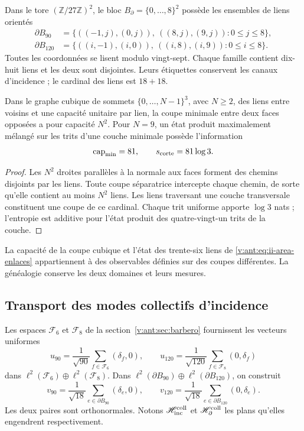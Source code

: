 Dans le tore \((\mathbb Z/27\mathbb Z)^2\), le bloc
\(B_\partial=\{0,\ldots,8\}^2\) possède les ensembles de liens
orientés
\begin{align}
 \partial B_{90}
 &=\{((-1,j),(0,j)),\ ((8,j),(9,j)):0\le j\le8\},\\
 \partial B_{120}
 &=\{((i,-1),(i,0)),\ ((i,8),(i,9)):0\le i\le8\}.
 \label{v:ant:eq:ii-area-enlaces}
\end{align}
Toutes les coordonnées se lisent modulo vingt-sept. Chaque famille contient
dix-huit liens et les deux sont disjointes. Leurs étiquettes conservent les
canaux d’incidence ; le cardinal des liens est \(18+18\).

\begin{theorem}
\label{v:ant:thm:ii-area-corte-minimo}
Dans le graphe cubique de sommets \(\{0,\ldots,N-1\}^3\), avec
\(N\ge2\), des liens entre voisins et une capacité unitaire par lien,
la coupe minimale entre deux faces opposées a pour capacité \(N^2\).
Pour \(N=9\), un état produit maximalement mélangé sur les
trits d'une couche minimale possède l'information
\begin{equation}
 \operatorname{cap}_{\min}=81,\qquad s_{\rm corte}=81\log3.
 \label{v:ant:eq:ii-area-corte-informacion}
\end{equation}
\end{theorem}
\begin{proof}
Les \(N^2\) droites parallèles à la normale aux faces forment des chemins
disjoints par les liens. Toute coupe séparatrice intercepte chaque chemin, de
sorte qu'elle contient au moins \(N^2\) liens. Les liens traversant
une couche transversale constituent une coupe de ce cardinal. Chaque trit
uniforme apporte \(\log3\) nats ; l'entropie est additive pour l'état
produit des quatre-vingt-un trits de la couche.
\end{proof}

La capacité de la coupe cubique et l'état des trente-six liens
de \eqref{v:ant:eq:ii-area-enlaces} appartiennent à des observables définies sur
des coupes différentes. La généalogie conserve les deux domaines et leurs mesures.

\subsection{Transport des modes collectifs d'incidence}
\label{v:ant:sec:ii-area-transporte-colectivo}

Les espaces \(\mathcal F_6\) et \(\mathcal F_8\) de la
section~\ref{v:ant:sec:barbero} fournissent les vecteurs uniformes
\[
 u_{90}=\frac1{\sqrt{90}}\sum_{f\in\mathcal F_6}(\delta_f,0),
 \qquad
 u_{120}=\frac1{\sqrt{120}}\sum_{f\in\mathcal F_8}(0,\delta_f)
\]
dans \(\ell^2(\mathcal F_6)\oplus\ell^2(\mathcal F_8)\).
Dans \(\ell^2(\partial B_{90})\oplus\ell^2(\partial B_{120})\),
on construit
\[
 v_{90}=\frac1{\sqrt{18}}\sum_{e\in\partial B_{90}}(\delta_e,0),
 \qquad
 v_{120}=\frac1{\sqrt{18}}\sum_{e\in\partial B_{120}}(0,\delta_e).
\]
Les deux paires sont orthonormales. Notons
\(\mathscr H_{\rm inc}^{\rm coll}\) et
\(\mathscr H_\partial^{\rm coll}\) les plans qu'elles engendrent respectivement.

